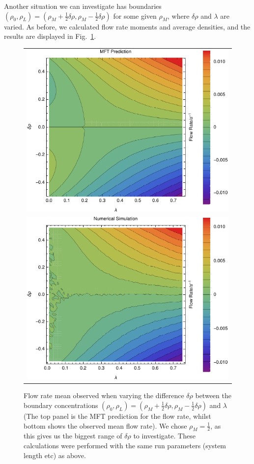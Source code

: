 \documentclass[
reprint,
 amsmath,amssymb,
 aps,
 prl,
]{revtex4-1}
\begin{document}
Another situation we can investigate has boundaries $(\rho_0, \rho_L) = (\rho_M + \frac{1}{2} \delta\rho, \rho_M - \frac{1}{2} \delta\rho)$ for some given $\rho_M$, where $\delta\rho$ and $\lambda$ are varied. As before, we calculated flow rate
moments and average densities, and the results are displayed in Fig.~\ref{fig:constDens}.
\begin{figure}[h!]
\vspace{1em}
\caption{\label{fig:constDens} Flow rate mean observed when varying the difference $\delta\rho$ between the boundary concentrations
$(\rho_0, \rho_L) = (\rho_M + \frac{1}{2} \delta\rho, \rho_M - \frac{1}{2} \delta\rho)$ and $\lambda$ (The top panel is the MFT prediction
for the flow rate, whilst bottom shows the observed mean flow rate).
We chose $\rho_M=\frac{1}{2}$, as this gives us the biggest range of $\delta\rho$ to investigate.
These calculations were performed with the same run parameters (system length etc)
as above.}
\begin{center}
 \begin{tabular}{c}
    \includegraphics[width=0.98\linewidth]{newMftPred} \\
    \includegraphics[width=0.98\linewidth]{newFlow}

\end{tabular}
\end{center}
\end{figure}
\end{document}
